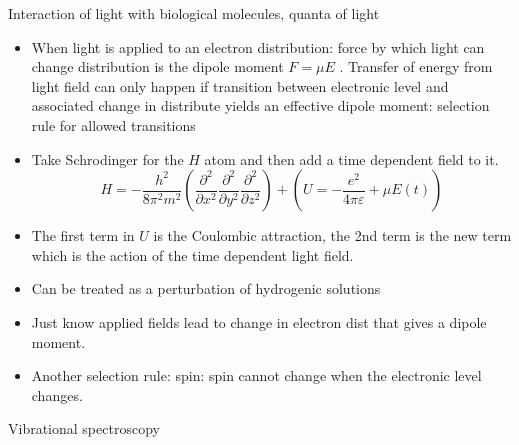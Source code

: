 \documentclass[10pt]{article}
\begin{document}
Interaction of light with biological molecules, quanta of light

\begin{itemize}
	\item When light is applied to an electron distribution: force by which light can change distribution is the dipole moment $ F = \mu E $ . Transfer of energy from light field can only happen if transition between electronic level and associated change in distribute yields an effective dipole moment: selection rule for allowed transitions
	\item Take Schrodinger for the $ H $ atom and then add a time dependent field to it. 
		\begin{equation}
			H = -\frac{h^2}{8\pi^2m^2} ( \frac{\partial^2 }{\partial x^2} \frac{\partial^2 }{\partial y^2} \frac{\partial^2 }{\partial z^2} )
			+ (U = -\frac{e^2}{4\pi\varepsilon} + \mu E(t))
		\end{equation}
	\item The first term in $ U $ is the Coulombic attraction, the 2nd term is the new term which is the action of the time dependent light field.
	\item Can be treated as a perturbation of hydrogenic solutions
	\item Just know applied fields lead to change in electron dist that gives a dipole moment.
	\item Another selection rule: spin: spin cannot change when the electronic level changes.
\end{itemize}

Vibrational spectroscopy
\end{document}
